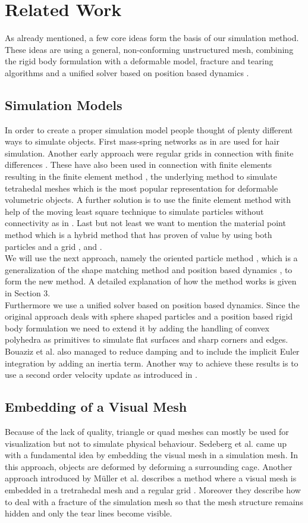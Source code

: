 \documentclass[
	11pt, 
	DIV10,
	a4paper, 
	oneside, 
	headings=normal, 
	captions=tableheading,
	final, 
	numbers=noenddot
]{scrartcl}
\begin{document}
\section{Related Work}
	As already mentioned, a few core ideas form the basis of our simulation method. These ideas are using a general, non-conforming unstructured mesh, combining the rigid body formulation with a deformable model, fracture and tearing algorithms and a unified solver based on position based dynamics \cite{3}.

\subsection{Simulation Models}
	In order to create a proper simulation model people thought of plenty different ways to simulate objects. First mass-spring networks as in \cite{4} are used for hair simulation. Another early approach were regular grids in connection with finite differences \cite{5}. These have also been used in connection with finite elements resulting in the finite element method \cite{6}, the underlying method to simulate tetrahedal meshes which is the most popular representation for deformable volumetric objects. A further solution is to use the finite element method with help of the moving least square technique to simulate particles without connectivity as in \cite{7}. Last but not least we want to mention the material point method which is a hybrid method that has proven of value by using both particles and a grid \cite{8}, \cite{9} and \cite{10}.\\
	We will use the next approach, namely the oriented particle method \cite{2}, which is a generalization of the shape matching method and position based dynamics \cite{11}, to form the new method. A detailed explanation of how the method works is given in Section 3.\\
	Furthermore we use a unified solver based on position based dynamics. Since the original approach deals with sphere shaped particles and a position based rigid body formulation we need to extend it by adding the handling of convex polyhedra as primitives to simulate flat surfaces and sharp corners and edges. Bouaziz et al. also managed to reduce damping and to include the implicit Euler integration by adding an inertia term.\cite{12} Another way to achieve these results is to use a second order velocity update as introduced in \cite{3}.
	
\subsection{Embedding of a Visual Mesh}
	Because of the lack of quality, triangle or quad meshes can mostly be used for visualization but not to simulate physical behaviour. Sedeberg et al. came up with a fundamental idea by embedding the visual mesh in a simulation mesh.\cite{13} In this approach, objects are deformed by deforming a surrounding cage. Another approach introduced by Müller et al. describes a method where a visual mesh is embedded in a tretrahedal mesh \cite{14} and a regular grid \cite{6}. Moreover they describe how to deal with a fracture of the simulation mesh so that the mesh structure remains hidden and only the tear lines become visible.
	
\end{document}

